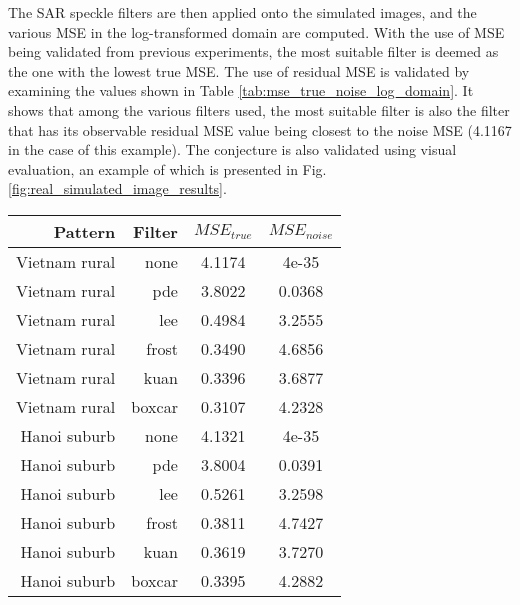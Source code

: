 The SAR speckle filters are then applied onto the simulated images, and the various MSE in the log-transformed domain are computed.
With the use of MSE being validated from previous experiments, 
	the most suitable filter is deemed as the one with the lowest true MSE.
The use of residual MSE is validated by examining the values shown in Table \ref{tab:mse_true_noise_log_domain}.
It shows that among the various filters used, 
	the most suitable filter is also the filter that 
		has its observable residual MSE value being closest to the noise MSE (4.1167 in the case of this example).
The conjecture is also validated using visual evaluation, an example of
	which is presented in Fig. \ref{fig:real_simulated_image_results}.

\begin{table}[h!]
\centering
\begin{tabular}{r|r|c|c}
Pattern  & Filter  & $MSE_{true}$   & $MSE_{noise}$      \\%
\hline
Vietnam rural	& none		& 4.1174	& 4e-35\\
Vietnam rural	& pde			& 3.8022	& 0.0368\\
Vietnam rural	& lee			& 0.4984	& 3.2555\\
Vietnam rural	& frost		& 0.3490	& 4.6856\\
Vietnam rural	& kuan		& 0.3396	& 3.6877\\
Vietnam rural	& boxcar	& 0.3107	& 4.2328\\
\hline
Hanoi suburb	& none		& 4.1321	& 4e-35\\
Hanoi suburb	& pde			& 3.8004	& 0.0391\\
Hanoi suburb	& lee			& 0.5261	& 3.2598\\
Hanoi suburb	& frost		& 0.3811	& 4.7427\\
Hanoi suburb	& kuan		& 0.3619	& 3.7270\\
Hanoi suburb	& boxcar	& 0.3395	& 4.2882\\
\hline
\end{tabular}


\end{table}
